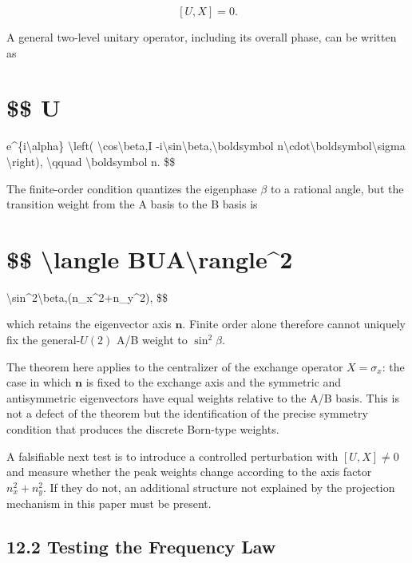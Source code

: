 \documentclass[
  a4paper,
  10pt]{article}
\begin{document}
\[
[U,X]=0.
\]

A general two-level unitary operator, including its overall phase, can
be written as

\section{\$\$ U}\label{-u}

e\^{}\{i\textbackslash alpha\} \textbackslash left(
\textbackslash cos\textbackslash beta,I
-i\textbackslash sin\textbackslash beta,\textbackslash boldsymbol
n\textbackslash cdot\textbackslash boldsymbol\textbackslash sigma
\textbackslash right), \textbackslash qquad
\textbar\textbackslash boldsymbol n. \$\$

The finite-order condition quantizes the eigenphase \(\beta\) to a
rational angle, but the transition weight from the A basis to the B
basis is

\section{\$\$ \textbar\textbackslash langle
B\textbar U\textbar A\textbackslash rangle\textbar\^{}2}\label{-langle-buarangle2}

\textbackslash sin\^{}2\textbackslash beta,(n\_x\^{}2+n\_y\^{}2), \$\$

which retains the eigenvector axis \(\boldsymbol n\). Finite order alone
therefore cannot uniquely fix the general-\(U(2)\) A/B weight to
\(\sin^2\beta\).

The theorem here applies to the centralizer of the exchange operator
\(X=\sigma_x\): the case in which \(\boldsymbol n\) is fixed to the
exchange axis and the symmetric and antisymmetric eigenvectors have
equal weights relative to the A/B basis. This is not a defect of the
theorem but the identification of the precise symmetry condition that
produces the discrete Born-type weights.

A falsifiable next test is to introduce a controlled perturbation with
\([U,X]\ne0\) and measure whether the peak weights change according to
the axis factor \(n_x^2+n_y^2\). If they do not, an additional structure
not explained by the projection mechanism in this paper must be present.

\subsection{12.2 Testing the Frequency
Law}\label{122-testing-the-frequency-law}
\end{document}
